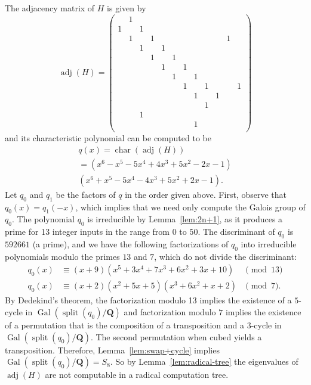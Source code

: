 \documentclass[oribibl,10pt]{llncs}
\newcommand{\rationals}{\mathbf{Q}}
\DeclareMathOperator{\Gal}{Gal}
\DeclareMathOperator{\splitting}{split}
\DeclareMathOperator{\adjacency}{adj}
\DeclareMathOperator{\characteristic}{char}
\begin{document}
\begin{appendix}
The adjacency matrix of $H$ is given by
\[
\adjacency(H) =
\begin{pmatrix}
 & 1&  &  &  &  &  &  &  &  &  &  \\
1&  & 1&  &  &  &  &  &  &  &  &  \\
 & 1&  & 1&  &  &  &  &  &  & 1&  \\
 &  & 1&  & 1&  &  &  &  &  &  &  \\
 &  &  & 1&  & 1&  &  &  &  &  &  \\
 &  &  &  & 1&  & 1&  &  &  &  &  \\
 &  &  &  &  & 1&  & 1&  &  &  &  \\
 &  &  &  &  &  & 1&  & 1&  &  & 1\\
 &  &  &  &  &  &  & 1&  & 1&  &  \\
 &  &  &  &  &  &  &  & 1&  &  &  \\
 &  & 1&  &  &  &  &  &  &  &  &  \\
 &  &  &  &  &  &  & 1&  &  &  &  \\
\end{pmatrix}
\]
and its characteristic polynomial can be computed to be
\begin{multline*}
q(x) = \characteristic(\adjacency(H))\\ = (x^6 - x^5 - 5 x^4 + 4 x^3 + 5 x^2 - 2 x - 1)\\   (x^6 + x^5 - 5 x^4 - 4 x^3 + 5 x^2 + 2 x - 1).
\end{multline*}
Let $q_0$ and $q_1$ be the factors of $q$ in the order given above. First, observe that $q_0(x) = q_1(-x)$, which implies that we need only compute the Galois group of $q_0$. The polynomial $q_0$ is irreducible by Lemma~\ref{lem:2n+1}, as it produces a prime for 13 integer inputs in the range from 0 to $50$. The discriminant of $q_0$ is $592661$ (a prime), and we have the following factorizations of $q_0$ into irreducible polynomials modulo the primes $13$ and $7$, which do not divide the discriminant:
\begin{align*}
q_0(x) &\equiv  (x + 9)  (x^5 + 3x^4 + 7x^3 + 6x^2 + 3x + 10) &\pmod{13}\\
q_0(x) &\equiv  (x + 2)  (x^2 + 5x + 5)  (x^3 + 6x^2 + x + 2) &\pmod{7}.
\end{align*}
By Dedekind's theorem, the factorization modulo 13 implies the existence of a $5$-cycle in $\Gal(\splitting(q_0)/\rationals)$ and factorization modulo $7$ implies the existence of a permutation that is the composition of a transposition and a $3$-cycle in $\Gal(\splitting(q_0)/\rationals)$. The second permutation when cubed yields a transposition. Therefore, Lemma~\ref{lem:swap+cycle} implies $\Gal(\splitting(q_0)/\rationals) = S_8$. So by Lemma~\ref{lem:radical-tree} the eigenvalues of $\adjacency(H)$ are not computable in a radical computation tree.


\end{appendix}
\end{document}
